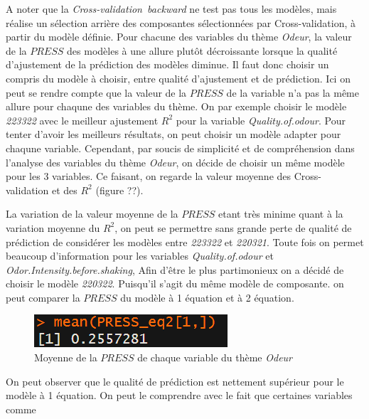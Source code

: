 \documentclass[a4paper,french,10pt]{article}
\begin{document}
A noter que la \textit{Cross-validation~backward} ne test pas tous les modèles, mais réalise un sélection arrière des composantes sélectionnées par Cross-validation, à partir du modèle définie. \newline
Pour chacune des variables du thème \textit{Odeur}, la valeur de la $PRESS$ des modèles à une allure plutôt décroissante lorsque la qualité d'ajustement de la prédiction des modèles diminue. Il faut donc choisir un compris du modèle à choisir, entre qualité d'ajustement et de prédiction. \newline
Ici on peut se rendre compte que la valeur de la $PRESS$ de la variable n'a pas la même allure pour chaqune des variables du thème. On par exemple choisir le modèle \textit{223322} avec le meilleur ajustement $R^2$ pour la variable \textit{Quality.of.odour}. Pour tenter d'avoir les meilleurs résultats, on peut choisir un modèle adapter pour chaqune variable. Cependant, par soucis de simplicité et de compréhension dans l'analyse des variables du thème \textit{Odeur}, on décide de choisir un même modèle pour les 3 variables. Ce faisant, on regarde la valeur moyenne des Cross-validation et des $R^2$ (figure ??).\newline

La variation de la valeur moyenne de la $PRESS$ etant très minime quant à la variation moyenne du $R^2$, on peut se permettre sans grande perte de qualité de prédiction de considérer les modèles entre \textit{223322} et \textit{220321}. Toute fois on permet beaucoup d'information pour les variables \textit{Quality.of.odour} et \textit{Odor.Intensity.before.shaking}, Afin d'être le plus partimonieux on a décidé de choisir le modèle \textit{220322}. Puisqu'il s'agit du même modèle de composante. on peut comparer la $PRESS$ du modèle à 1 équation et à 2 équation. 

\begin{figure}[htp] 
	\centering
	\includegraphics[scale=0.45]{images/mean_PRESS_eq2.png}
	\caption{Moyenne de la $PRESS$ de chaque variable du thème \textit{Odeur}}
\end{figure}

On peut observer que le qualité de prédiction est nettement supérieur pour le modèle à 1 équation. On peut le comprendre avec le fait que certaines variables comme 

\newpage
\end{document}
